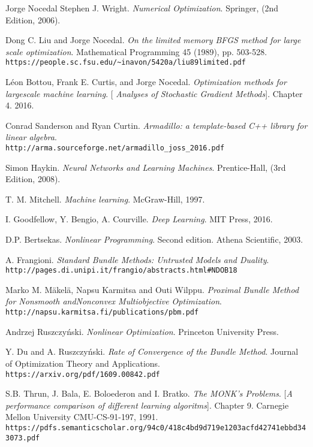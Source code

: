 \begin{thebibliography}{9}

	Jorge Nocedal  Stephen J. Wright.
	\textit{Numerical Optimization}. Springer, (2nd Edition, 2006).

	Dong C. Liu and Jorge Nocedal.
	\textit{On the limited memory BFGS method for large scale optimization}. Mathematical Programming 45 (1989), pp. 503-528.
	\\\texttt{https://people.sc.fsu.edu/\textasciitilde inavon/5420a/liu89limited.pdf}
		
	Léon Bottou, Frank E. Curtis, and Jorge Nocedal.
	\textit{Optimization methods for largescale machine learning}. 
	[\textit{ Analyses of Stochastic Gradient Methods}]. Chapter 4.
	2016.
	
	Conrad Sanderson and Ryan Curtin. 
	\textit{Armadillo: a template-based C++ library for linear algebra}. 
	\\\texttt{http://arma.sourceforge.net/armadillo\_joss\_2016.pdf}

	
	Simon Haykin. 
	\textit{Neural Networks and Learning Machines}. 
	Prentice-Hall, (3rd Edition, 2008).


	T. M. Mitchell. 
	\textit{Machine learning}. 
	McGraw-Hill, 1997.
	
	I. Goodfellow, Y. Bengio, A. Courville. 
	\textit{Deep Learning}. 
	MIT Press,  2016.
	
	D.P. Bertsekas.
	\textit{Nonlinear Programming}. 
	Second edition. Athena Scientific, 2003.
	
	A. Frangioni.
	\textit{Standard Bundle Methods: Untrusted Models and Duality}.
	\\\texttt{http://pages.di.unipi.it/frangio/abstracts.html\#NDOB18}
	
	Marko M. M\"akel\"a, Napsu Karmitsa and Outi Wilppu.
	\textit{Proximal Bundle Method for Nonsmooth andNonconvex Multiobjective Optimization}.
	\\\texttt{http://napsu.karmitsa.fi/publications/pbm.pdf}
	
	Andrzej Ruszczyński.
	\textit{Nonlinear Optimization}. Princeton University Press. 
	
	Y. Du and A. Ruszczyński.
	\textit{Rate of Convergence of the Bundle Method}. Journal  of  Optimization Theory and Applications.
	\\\texttt{https://arxiv.org/pdf/1609.00842.pdf}


	S.B. Thrun, J. Bala, E. Boloederon and I. Bratko.
	\textit{The MONK's Problems}. 
	[\textit{A performance comparison of different learning algoritms}]. Chapter 9.
	Carnegie Mellon University CMU-CS-91-197, 1991.
	\\\texttt{https://pdfs.semanticscholar.org/94c0/418c4bd9d719e1203acfd42741ebbd343073.pdf}
	

 

	
\end{thebibliography}